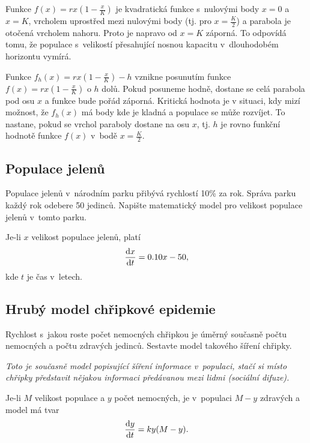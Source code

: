 \reseni
Funkce $f(x)=rx\left(1-\frac xK\right)$ je kvadratická funkce s nulovými body $x=0$ a $x=K$, vrcholem uprostřed mezi nulovými body (tj. pro $x=\frac K2$) a parabola je otočená vrcholem nahoru. Proto je napravo od $x=K$ záporná. To odpovídá tomu, že populace s velikostí přesahující nosnou kapacitu v dlouhodobém horizontu vymírá.

Funkce $f_h(x)=rx\left(1-\frac xK\right)-h$ vznikne posunutím funkce $f(x)=rx\left(1-\frac xK\right)$ o $h$ dolů. Pokud posuneme hodně, dostane se celá parabola pod osu $x$ a funkce bude pořád záporná. Kritická hodnota je v situaci, kdy mizí možnost, že $f_h(x)$ má body kde je kladná a populace se může rozvíjet. To nastane,  pokud se vrchol paraboly dostane na osu $x$, tj. $h$ je rovno funkční hodnotě funkce $f(x)$ v bodě $x=\frac K2.$
\konec



\stranka


\subsection{Populace jelenů}

 Populace jelenů v~národním parku přibývá rychlostí 10\% za
    rok. Správa parku každý rok odebere 50 jedinců. Napište
    matematický model pro velikost populace jelenů v~tomto parku.

    \reseni
    Je-li $x$ velikost populace jelenů, platí
    \begin{equation*}
      \frac{\mathrm{d}x}{\mathrm{d}t}=0.10 x-50, 
    \end{equation*}
    kde $t$ je čas v letech.
\konec


\subsection{Hrubý model chřipkové epidemie}  Rychlost
s jakou roste počet nemocných chřipkou je úměrný současně počtu
nemocných a počtu zdravých jedinců. Sestavte model takového šíření
chřipky.

\textit{Toto je současně model popisující šíření informace v populaci, stačí si místo chřipky představit nějakou informaci předávanou mezi lidmi (sociální difuze).}

\reseni
Je-li $M$ velikost populace a $y$ počet nemocných, je v populaci $M-y$ zdravých a model má tvar
$$\frac{\mathrm{d}y}{\mathrm{d}t}=ky(M-y).$$

\konec



